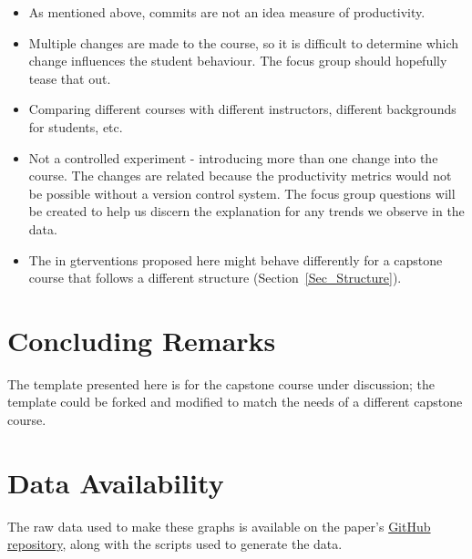 \documentclass[10pt, conference]{IEEEtran}
\begin{document}
\begin{itemize}
    \item As mentioned above, commits are not an idea measure of productivity.
    \item Multiple changes are made to the course, so it is difficult to
    determine which change influences the student behaviour.  The focus group
    should hopefully tease that out.
    \item Comparing different courses with different instructors, different
    backgrounds for students, etc.
    \item Not a controlled experiment - introducing more than one change into
    the course.  The changes are related because the productivity metrics would
    not be possible without a version control system. The focus group questions
    will be created to help us discern the explanation for any trends we observe
    in the data.
    \item The in gterventions proposed here might behave differently for a
    capstone course that follows a different structure
    (Section~\ref{Sec_Structure}).

\end{itemize}

\section{Concluding Remarks} \label{SecConclusions}

The template presented here is for the capstone course under discussion; the
template could be forked and modified to match the needs of a different capstone
course.

\section{Data Availability}
The raw data used to make these graphs is available on the paper's 
\href{REDACTED Link}{GitHub repository}, along with the scripts used to generate
the data.



\end{document}
